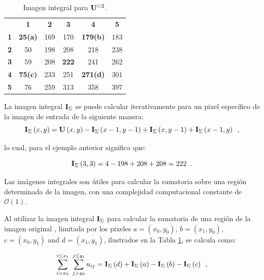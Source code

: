 \begin{table}
\caption{Imagen integral para $\mathbf{U}^{\odot2}$.\label{table:integralcuad}}
\begin{center}
\renewcommand{\arraystretch}{1.4}
\setlength\tabcolsep{3pt}
{
\begin{tabular}{cc|ccc|c}
 & \multicolumn{1}{c}{\textbf{1}} & \textbf{2} & \textbf{3} & \multicolumn{1}{c}{\textbf{4}} & \textbf{5}\tabularnewline
\textbf{1} & \multicolumn{1}{c}{\textbf{25(a)}} & 169 & 170 & \multicolumn{1}{c}{\textbf{179(b)}} & 183\tabularnewline
\cline{3-5} 
\textbf{2} & 50 & 198 & 208 & 218 & 238\tabularnewline
\textbf{3} & 59 & 208 & \textbf{222} & 241 & 262\tabularnewline
\textbf{4} & \textbf{75(c)} & 233 & 251 & \textbf{271(d)} & 301\tabularnewline
\cline{3-5} 
\textbf{5} & \multicolumn{1}{c}{76} & 259 & 313 & \multicolumn{1}{c}{358} & 397\tabularnewline
\end{tabular}
}
\par\end{center}
\end{table}


La imagen integral $\mathbf{I}_{\Sigma}$ se puede calcular iterativamente para un pixel específico de la imagen de entrada  de la siguiente manera: 
\begin{equation}
\mathbf{I}_{\Sigma}\left(x,y\right)=\mathbf{U}\left(x,y\right)-\mathbf{I}_{\Sigma}\left(x-1,y-1\right)+\mathbf{I}_{\Sigma}\left(x,y-1\right)
+\mathbf{I}_{\Sigma}\left(x-1,y\right) \enspace ,
\end{equation}

lo cual, para el ejemplo anterior significa que:

\begin{equation}
\mathbf{I}_{\Sigma}\left(3,3\right)=4-198+208+208=222 \enspace .
\end{equation}

Las imágenes integrales son útiles para calcular la sumatoria sobre una región determinada de la imagen, con una complejidad computacional constante de $\mathcal{O}(1)$. 

Al utilizar la imagen integral $\mathbf{I}_{\Sigma}$ para calcular la sumatoria de una región de la imagen original , limitada por los pixeles $a=\left(x_{0},y_{0}\right)$,
$b=\left(x_{1},y_{0}\right)$, $c=\left(x_{0},y_{1}\right)$ and $d=\left(x_{1},y_{1}\right)$, ilustrados en la Tabla \ref{table:integralcuad}, se calcula como: 

\begin{equation}
\sum_{i>x_{0}}^{i\leq x_{1}}~\sum_{j>y_{0}}^{j\leq y_{1}}u_{ij}=\mathbf{I}_{\Sigma}\left(d\right)+\mathbf{I}_{\Sigma}\left(a\right)-\mathbf{I}_{\Sigma}\left(b\right)-\mathbf{I}_{\Sigma}\left(c\right) \enspace ,
\end{equation}


